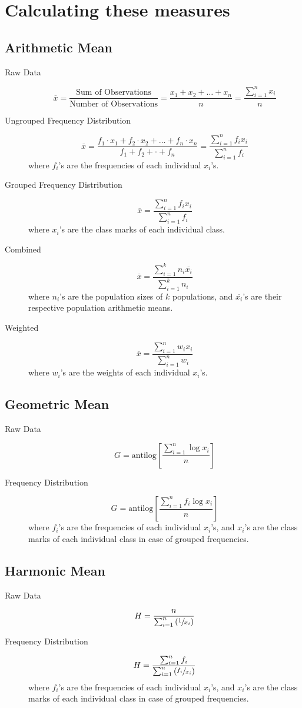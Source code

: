 \documentclass[
10pt, %
a4paper, %
]{report}
\begin{document}
\section{Calculating these measures}

\subsection{Arithmetic Mean}
\begin{description}
\item[Raw Data]
\[
\overline{x} = \frac{\text{Sum of Observations}}{\text{Number of Observations}} = \frac{x_1 + x_2 + \dots + x_n}{n} = \frac{\sum_{i=1}^n x_i}{n}
\]
\item[Ungrouped Frequency Distribution]
\[
\overline{x} = \frac{f_1 \cdot x_1 + f_2 \cdot x_2 + \dots + f_n \cdot x_n}{f_1 + f_2 + \cdot + f_n} = \frac{\sum_{i=1}^n f_i x_i}{\sum_{i=1}^n f_i}
\]
where \(f_i\)'s are the frequencies of each individual \(x_i\)'s.
\item[Grouped Frequency Distribution]
\[
\overline{x} = \frac{\sum_{i=1}^n f_i x_i}{\sum_{i=1}^n f_i}
\]
where \(x_i\)'s are the class marks of each individual class.
\item[Combined]
\[
\overline{x} = \frac{\sum_{i=1}^k n_i \overline{x_i}}{\sum_{i=1}^k n_i}
\]
where \(n_i\)'s are the population sizes of \(k\) populations, and \(\overline{x_i}\)'s are their respective population arithmetic means.
\item[Weighted]
\[
\overline{x} = \frac{\sum_{i=1}^n w_i x_i}{\sum_{i=1}^n w_i}
\]
where \(w_i\)'s are the weights of each individual \(x_i\)'s.
\end{description}

\subsection{Geometric Mean}
\begin{description}
\item[Raw Data]
\[
G = \mathrm{antilog} \left[ \frac{\sum_{i=1}^n \log x_i}{n} \right]
\]
\item[Frequency Distribution]
\[
G = \mathrm{antilog} \left[ \frac{\sum_{i=1}^n f_i \log x_i}{n} \right]
\]
where \(f_i\)'s are the frequencies of each individual \(x_i\)'s, and \(x_i\)'s are the class marks of each individual class in case of grouped frequencies.
\end{description}

\subsection{Harmonic Mean}
\begin{description}
\item[Raw Data]
\[
H = \dfrac{n}{\sum_{i=1}^n \left( \sfrac{1}{x_i} \right)}
\]
\item[Frequency Distribution]
\[
H = \dfrac{\sum_{i=1}^{n} f_i}{\sum_{i=1}^{n} \left( \sfrac{f_i}{x_i} \right)}
\]
where \(f_i\)'s are the frequencies of each individual \(x_i\)'s, and \(x_i\)'s are the class marks of each individual class in case of grouped frequencies.
\end{description}
\end{document}
